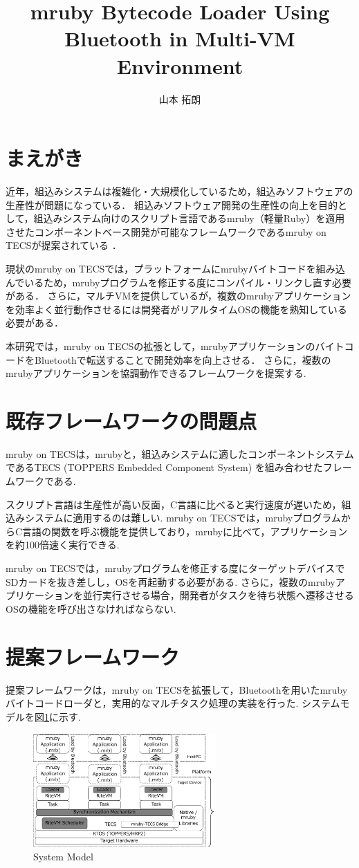 \documentclass[a4j,10pt,twocolumn]{utf8/abstract}
\title{mruby Bytecode Loader Using Bluetooth in Multi-VM Environment}	%
\author{山本 拓朗} 		%
\begin{document}
\absttitle 		%

\section{まえがき}
近年，組込みシステムは複雑化・大規模化しているため，組込みソフトウェアの生産性が問題になっている．
組込みソフトウェア開発の生産性の向上を目的として，組込みシステム向けのスクリプト言語であるmruby（軽量Ruby）を適用させたコンポーネントベース開発が可能なフレームワークであるmruby on TECSが提案されている \cite{mrubyontecs}．

現状のmruby on TECSでは，プラットフォームにmrubyバイトコードを組み込んでいるため，mrubyプログラムを修正する度にコンパイル・リンクし直す必要がある．
さらに，マルチVMを提供しているが，複数のmrubyアプリケーションを効率よく並行動作させるには開発者がリアルタイムOSの機能を熟知している必要がある．

本研究では，mruby on TECSの拡張として，mrubyアプリケーションのバイトコードをBluetoothで転送することで開発効率を向上させる．
さらに，複数のmrubyアプリケーションを協調動作できるフレームワークを提案する.

\section{既存フレームワークの問題点}
mruby on TECSは，mrubyと，組込みシステムに適したコンポーネントシステムであるTECS (TOPPERS Embedded Component System) を組み合わせたフレームワークである.

スクリプト言語は生産性が高い反面，C言語に比べると実行速度が遅いため，組込みシステムに適用するのは難しい.
mruby on TECSでは，mrubyプログラムからC言語の関数を呼ぶ機能を提供しており，mrubyに比べて，アプリケーションを約100倍速く実行できる.

mruby on TECSでは，mrubyプログラムを修正する度にターゲットデバイスでSDカードを抜き差しし，OSを再起動する必要がある.
さらに，複数のmrubyアプリケーションを並行実行させる場合，開発者がタスクを待ち状態へ遷移させるOSの機能を呼び出さなければならない.
　
\section{提案フレームワーク}
提案フレームワークは，mruby on TECSを拡張して，Bluetoothを用いたmrubyバイトコードローダと，実用的なマルチタスク処理の実装を行った.
システムモデルを図\ref{fig:system_model}に示す.
\begin{figure}[h]
    \centering
    \includegraphics[width=7cm,clip]{Abst_SystemModel.pdf}
    \caption{System Model}
    \label{fig:system_model}
\end{figure}
\end{document}
